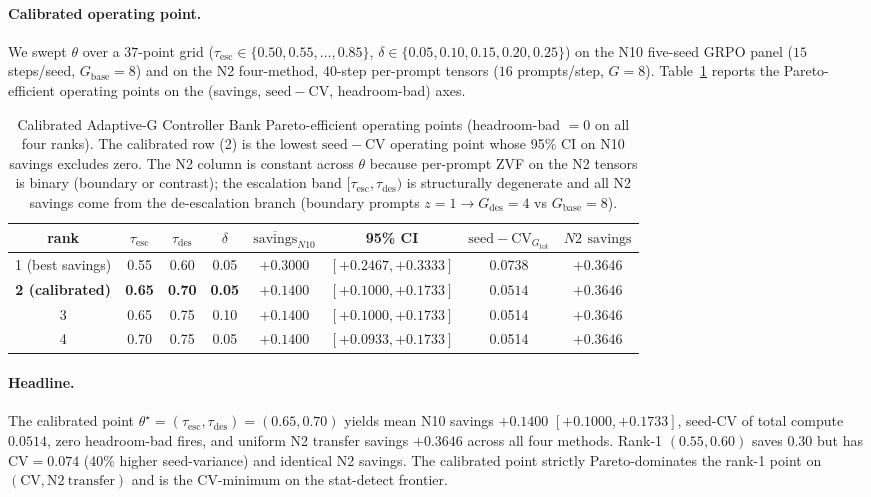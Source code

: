\documentclass{article}
\begin{document}
\paragraph{Calibrated operating point.}
We swept $\theta$ over a $37$-point grid
($\tau_{\mathrm{esc}}\in\{0.50,0.55,\ldots,0.85\}$,
$\delta\in\{0.05,0.10,0.15,0.20,0.25\}$) on the N10 five-seed
GRPO panel ($15$ steps/seed, $G_{\mathrm{base}}{=}8$) and on the
N2 four-method, $40$-step per-prompt tensors
($16$ prompts/step, $G{=}8$). Table~\ref{tab:p7-unified-bank}
reports the Pareto-efficient operating points on the
(savings, $\mathrm{seed{-}CV}$, headroom-bad) axes.

\begin{table}[t]
\centering
\small
\begin{tabular}{cccccccc}
\toprule
rank & $\tau_{\mathrm{esc}}$ & $\tau_{\mathrm{des}}$ & $\delta$ &
$\overline{\mathrm{savings}}_{N10}$ & 95\% CI &
$\mathrm{seed{-}CV}_{G_{\mathrm{tot}}}$ & $N2$ $\mathrm{savings}$ \\
\midrule
1 (best savings) & 0.55 & 0.60 & 0.05 & $+0.3000$ & $[+0.2467, +0.3333]$ & 0.0738 & $+0.3646$ \\
\textbf{2 (calibrated)} & \textbf{0.65} & \textbf{0.70} & \textbf{0.05} & $\mathbf{+0.1400}$ & $\mathbf{[+0.1000, +0.1733]}$ & $\mathbf{0.0514}$ & $\mathbf{+0.3646}$ \\
3 & 0.65 & 0.75 & 0.10 & $+0.1400$ & $[+0.1000, +0.1733]$ & 0.0514 & $+0.3646$ \\
4 & 0.70 & 0.75 & 0.05 & $+0.1400$ & $[+0.0933, +0.1733]$ & 0.0514 & $+0.3646$ \\
\bottomrule
\end{tabular}
\caption{Calibrated Adaptive-G Controller Bank Pareto-efficient
operating points (headroom-bad $= 0$ on all four ranks).
The calibrated row (2) is the lowest $\mathrm{seed{-}CV}$ operating
point whose 95\% CI on N10 savings excludes zero. The N2 column
is constant across $\theta$ because per-prompt ZVF on the N2
tensors is binary (boundary or contrast); the escalation band
$[\tau_{\mathrm{esc}},\tau_{\mathrm{des}})$ is structurally
degenerate and all N2 savings come from the de-escalation branch
(boundary prompts $z{=}1 \to G_{\mathrm{des}}{=}4$ vs $G_{\mathrm{base}}{=}8$).
\label{tab:p7-unified-bank}}
\end{table}

\paragraph{Headline.} The calibrated point
$\theta^\star = (\tau_{\mathrm{esc}}, \tau_{\mathrm{des}}) = (0.65, 0.70)$
yields mean N10 savings $+0.1400$
$[+0.1000, +0.1733]$, seed-CV of total compute $0.0514$,
zero headroom-bad fires, and uniform N2 transfer savings $+0.3646$
across all four methods. Rank-1 $(0.55, 0.60)$ saves $0.30$ but has
$\mathrm{CV}=0.074$ (40\% higher seed-variance) and identical N2
savings. The calibrated point strictly Pareto-dominates the
rank-1 point on $(\mathrm{CV}, \mathrm{N2\ transfer})$ and is the
$\mathrm{CV}$-minimum on the stat-detect frontier.
\end{document}
